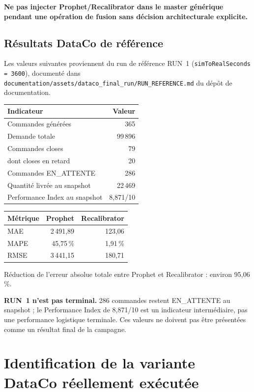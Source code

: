 \documentclass[11pt,a4paper]{article}
\newcommand{\code}[1]{\texttt{#1}}
\begin{document}
\textbf{Ne pas injecter Prophet/Recalibrator dans le master générique
pendant une opération de fusion sans décision architecturale explicite.}

\subsection{Résultats DataCo de référence}

Les valeurs suivantes proviennent du run de référence RUN~1
(\code{simToRealSeconds = 3600}), documenté dans
\code{documentation/assets/dataco\_final\_run/RUN\_REFERENCE.md} du dépôt
de documentation.

\begin{center}
\small
\begin{tabular}{lr}
\toprule
Indicateur & Valeur \\
\midrule
Commandes générées & 365 \\
Demande totale & 99\,896 \\
Commandes closes & 79 \\
dont closes en retard & 20 \\
Commandes EN\_ATTENTE & 286 \\
Quantité livrée au snapshot & 22\,469 \\
Performance Index au snapshot & 8,871/10 \\
\bottomrule
\end{tabular}
\end{center}

\begin{center}
\small
\begin{tabular}{lrr}
\toprule
Métrique & Prophet & Recalibrator \\
\midrule
MAE & 2\,491,89 & 123,06 \\
MAPE & 45,75\,\% & 1,91\,\% \\
RMSE & 3\,441,15 & 180,71 \\
\bottomrule
\end{tabular}
\end{center}

Réduction de l'erreur absolue totale entre Prophet et Recalibrator :
environ 95,06\,\%.

\textbf{RUN~1 n'est pas terminal.} 286 commandes restent EN\_ATTENTE au
snapshot ; le Performance Index de 8,871/10 est un indicateur intermédiaire,
pas une performance logistique terminale. Ces valeurs ne doivent pas être
présentées comme un résultat final de la campagne.

\section{Identification de la variante DataCo réellement exécutée}
\label{sec:dataco-identite}
\end{document}
